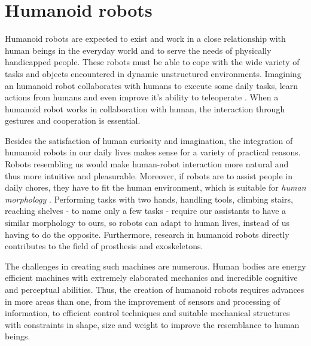 \section{Humanoid robots}

Humanoid robots are expected to exist and work in a close relationship with human beings in the everyday world and 
to serve the needs of physically handicapped people. These robots must be able to cope with the wide variety of tasks
and objects encountered in dynamic unstructured environments. Imagining an humanoid robot collaborates with humans 
to execute some daily tasks, learn actions from humans and even improve it's ability to teleoperate \cite{FUKAYA2001273}.
When a humanoid robot works in collaboration with human, the interaction through gestures and cooperation is essential. 

 

Besides the satisfaction of human curiosity and imagination, the integration of humanoid robots in our daily lives makes
sense for a variety of practical reasons. Robots resembling us would make human-robot interaction more natural and thus
more intuitive and pleasurable. Moreover, if robots are to assist people in daily chores, they have to fit the human 
environment, which is suitable for \textit{human morphology} \cite{Kemp2008}. Performing tasks with two hands, handling
tools, climbing stairs, reaching shelves - to name only a few tasks - require our assistants to have a similar 
morphology to ours, so robots can adapt to human lives, instead of us having to do the opposite. Furthermore, 
research in humanoid robots directly contributes to the field of prosthesis and exoskeletons.

 

The challenges in creating such machines are numerous. Human bodies are energy efficient machines with extremely elaborated 
mechanics and incredible cognitive and perceptual abilities. Thus, the creation of humanoid robots requires advances in 
more areas than one, from the improvement of sensors and processing of information, to efficient control techniques and 
suitable mechanical structures with constraints in shape, size and weight to improve the resemblance to human beings.

 

